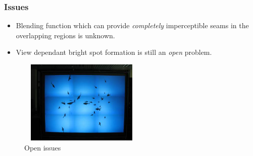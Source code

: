 \documentclass{beamer}
\begin{document}

\begin{frame}
\frametitle{Issues}
\begin{itemize}
\item Blending function which can provide \textit{completely} imperceptible seams in the overlapping regions is unknown. 
\item View dependant bright spot formation is still an \textit{open} problem.
\end{itemize}

\begin{figure}
\includegraphics[width=6.0cm,height=4.0cm]{figures/with_cross_rat1.jpg}
\caption{Open issues}
\end{figure}
\end{frame}

\end{document}
